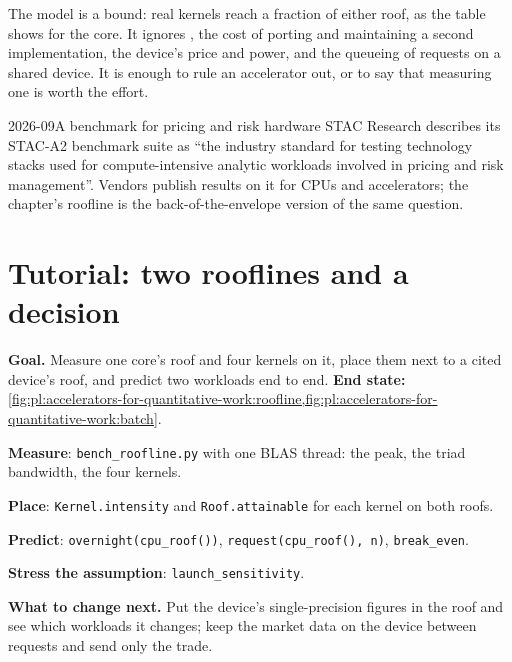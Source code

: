 \begin{remark}\label{rem:pl:accelerators-for-quantitative-work:limits}
The model is a bound: real kernels reach a fraction of either roof, as the table shows for the core. It ignores , the cost of
porting and maintaining a second implementation, the device's price and power, and the queueing of requests on a shared device. It is enough
to rule an accelerator out, or to say that measuring one is worth the effort.
\end{remark}

\begin{dated}{2026-09}{A benchmark for pricing and risk hardware}\label{dat:pl:accelerators-for-quantitative-work:stac}
STAC Research describes its STAC-A2 benchmark suite as ``the industry standard for testing technology stacks used for compute-intensive
analytic workloads involved in pricing and risk management''. Vendors publish results on it for CPUs and accelerators; the chapter's roofline
is the back-of-the-envelope version of the same question.
\end{dated}

\section{Tutorial: two rooflines and a decision}\label{tut:pl:accelerators-for-quantitative-work:tut}

\begin{tutorial}
\textbf{Goal.} Measure one core's roof and four kernels on it, place them next to a cited device's roof, and predict two workloads end to
end. \textbf{End state:} \cref{fig:pl:accelerators-for-quantitative-work:roofline,fig:pl:accelerators-for-quantitative-work:batch}.
\begin{tutsteps}
\item \textbf{Measure}: \texttt{bench\_roofline.py} with one BLAS thread: the peak, the triad bandwidth, the four kernels.
\item \textbf{Place}: \texttt{Kernel.intensity} and \texttt{Roof.attainable} for each kernel on both roofs.
\item \textbf{Predict}: \texttt{overnight(cpu\_roof())}, \texttt{request(cpu\_roof(), n)}, \texttt{break\_even}.
\item \textbf{Stress the assumption}: \texttt{launch\_sensitivity}.
\end{tutsteps}
\textbf{What to change next.} Put the device's single-precision figures in the roof and see which workloads it changes; keep the market data
on the device between requests and send only the trade.
\end{tutorial}

